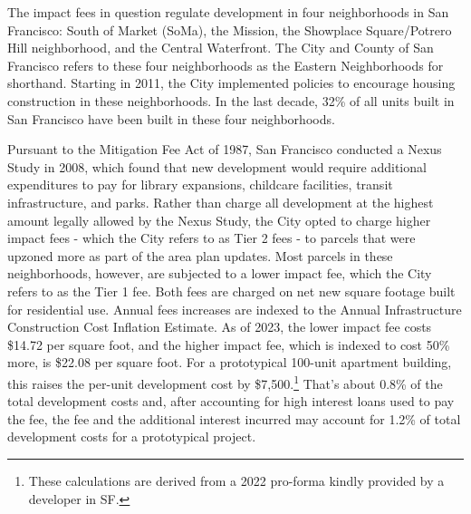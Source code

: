 \documentclass[a4paper,12pt]{article}
\begin{document}
The impact fees in question regulate development in four neighborhoods in San Francisco: South of Market (SoMa), the Mission, the Showplace Square/Potrero Hill neighborhood, and the Central Waterfront. The City and County of San Francisco refers to these four neighborhoods as the Eastern Neighborhoods for shorthand. Starting in 2011, the City implemented policies to encourage housing construction in these neighborhoods. In the last decade, 32\% of all units built in San Francisco have been built in these four neighborhoods. 

Pursuant to the Mitigation Fee Act of 1987, San Francisco conducted a Nexus Study in 2008, which found that new development would require additional expenditures to pay for library expansions, childcare facilities, transit infrastructure, and parks.\cite{SFPlanning2008} Rather than charge all development at the highest amount legally allowed by the Nexus Study, the City opted to charge higher impact fees - which the City refers to as Tier 2 fees - to parcels that were upzoned more as part of the area plan updates. Most parcels in these neighborhoods, however, are subjected to a lower impact fee, which the City refers to as the Tier 1 fee. Both fees are charged on net new square footage built for residential use. Annual fees increases are indexed to the Annual Infrastructure Construction Cost Inflation Estimate. As of 2023, the lower impact fee costs \$14.72 per square foot, and the higher impact fee, which is indexed to cost 50\% more, is \$22.08 per square foot.\cite{SF_ImpactFeeRegister_2022} For a prototypical 100-unit apartment building, this raises the per-unit development cost by \$7,500.\footnote{These calculations are derived from a 2022 pro-forma kindly provided by a developer in SF.} That's about 0.8\% of the total development costs and, after accounting for high interest loans used to pay the fee, the fee and the additional interest incurred may account for 1.2\% of total development costs for a prototypical project.\cite{phillips2021reducing}
\end{document}
